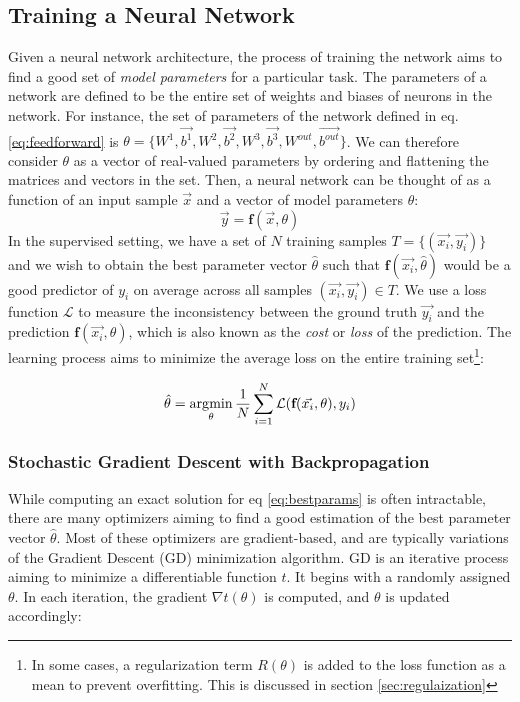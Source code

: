 \subsection{Training a Neural Network}
Given a neural network architecture, the process of training the network aims to find a good set of \emph{model parameters} for a particular task. The parameters of a network are defined to be the entire set of weights and biases of neurons in the network. For instance, the set of parameters of the network defined in eq. \ref{eq:feedforward} is $\theta = \{W^1, \vec{b^1}, W^2, \vec{b^2}, W^3, \vec{b^3}, W^{out}, \vec{b^{out}}\}$. We can therefore consider $\theta$ as a vector of real-valued parameters by ordering and flattening the matrices and vectors in the set. Then, a neural network can be thought of as a function of an input sample $\vec{x}$ and a vector of model parameters $\theta$: 
$$ \vec{y} = \textbf{f}(\vec{x}, \theta) $$ 
In the supervised setting, we have a set of $N$ training samples $T = \{(\vec{x_i}, \vec{y_i})\}$ and we wish to obtain the best parameter vector $\hat{\theta}$ such that $\textbf{f}(\vec{x_i}, \hat{\theta})$ would be a good predictor of $y_i$ on average across all samples $(\vec{x_i}, \vec{y_i}) \in T$.  We use a loss function $\mathcal{L}$ to measure the inconsistency between the ground truth $\vec{y_i}$ and the prediction $\textbf{f}(\vec{x_i}, \theta)$, which is also known as the \emph{cost} or \emph{loss} of the prediction. The learning process aims to minimize the average loss on the entire training set\footnote{In some cases, a regularization term $R(\theta)$ is added to the loss function as a mean to prevent overfitting. This is discussed in section \ref{sec:regulaization}}:

\begin{equation}
\hat{\theta} = \operatorname*{\arg\!\min}_{\theta} \frac{1}{N}\sum_{i=1}^N \mathcal{L}(\textbf{f}(\vec{x_i}, \theta), y_i)
\label{eq:bestparams}    
\end{equation}

\subsubsection{Stochastic Gradient Descent with Backpropagation}
While computing an exact solution for eq \ref{eq:bestparams} is often intractable, there are many optimizers aiming to find a good estimation of the best parameter vector $\hat{\theta}$. Most of these optimizers are gradient-based, and are typically variations of the Gradient Descent (GD) minimization algorithm. GD is an iterative process aiming to minimize a differentiable function $t$. It begins with a randomly assigned $\theta$. In each iteration, the gradient $\nabla t(\theta)$ is computed, and $\theta$ is updated accordingly:

